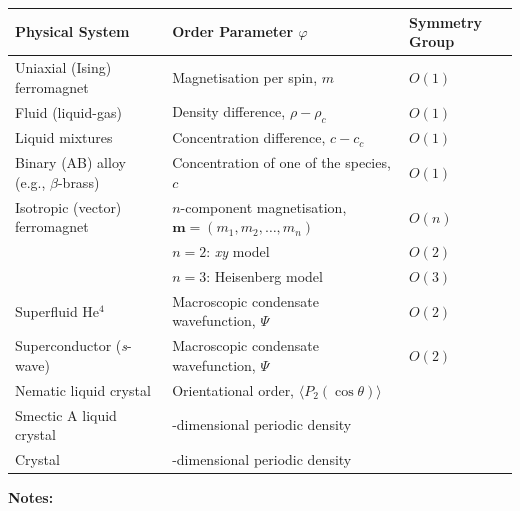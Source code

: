\documentclass[
  letterpaper,
  enabledeprecatedfontcommands]{report}
\begin{document}
\begin{tcolorbox}
\begin{longtable}[]{@{}
  >{\raggedright\arraybackslash}p{}
  >{\raggedright\arraybackslash}p{}
  >{\raggedright\arraybackslash}p{}@{}}
\toprule\noalign{}
\begin{minipage}[b]{\linewidth}\raggedright
Physical System
\end{minipage} & \begin{minipage}[b]{\linewidth}\raggedright
Order Parameter \(\varphi\)
\end{minipage} & \begin{minipage}[b]{\linewidth}\raggedright
Symmetry Group
\end{minipage} \\
\midrule\noalign{}
\endhead
\bottomrule\noalign{}
\endlastfoot
Uniaxial (Ising) ferromagnet & Magnetisation per spin, \(m\) &
\(O(1)\) \\
Fluid (liquid-gas) & Density difference, \(\rho - \rho_c\) & \(O(1)\) \\
Liquid mixtures & Concentration difference, \(c - c_c\) & \(O(1)\) \\
Binary (AB) alloy (e.g., \(\beta\)-brass) & Concentration of one of the
species, \(c\) & \(O(1)\) \\
Isotropic (vector) ferromagnet & \(n\)-component magnetisation,
\(\mathbf{m} = (m_1, m_2, \dots, m_n)\) & \(O(n)\) \\
& \(n = 2\): \emph{xy} model & \(O(2)\) \\
& \(n = 3\): Heisenberg model & \(O(3)\) \\
Superfluid He\(^4\) & Macroscopic condensate wavefunction, \(\Psi\) &
\(O(2)\) \\
Superconductor (\emph{s}-wave) & Macroscopic condensate wavefunction,
\(\Psi\) & \(O(2)\) \\
Nematic liquid crystal & Orientational order,
\(\langle P_2(\cos \theta)\rangle\) & \\
Smectic A liquid crystal & 1-dimensional periodic density & \\
Crystal & 3-dimensional periodic density & \\
\end{longtable}

\textbf{Notes:}


\end{tcolorbox}
\end{document}
